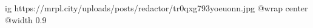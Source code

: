  
 
 
 
 

\ifcmt
  ig https://mrpl.city/uploads/posts/redactor/tr0qxg793yoeuonn.jpg
  @wrap center
  @width 0.9
\fi
